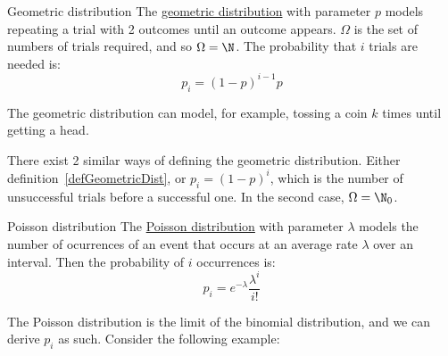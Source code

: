 \documentclass[../Main.tex]{subfiles}
\begin{document}
\begin{definition}{Geometric distribution}
    The \underline{geometric distribution} with parameter $p$ models repeating a trial with 2 outcomes until an outcome appears. $\Omega$ is the set of numbers of trials required, and so $\Omega = \N$. The probability that $i$ trials are needed is:
    \begin{equation*}
        p_i = (1-p)^{i-1}p
    \end{equation*}
    \label{defGeometricDist}
\end{definition}
The geometric distribution can model, for example, tossing a coin $k$ times until getting a head.
\begin{warning}
    There exist 2 similar ways of defining the geometric distribution. Either definition~\ref{defGeometricDist}, or $p_i = (1-p)^i$, which is the number of unsuccessful trials before a successful one. In the second case, $\Omega = \N_0$.
\end{warning}
\begin{definition}{Poisson distribution}
    The \underline{Poisson distribution} with parameter $\lambda$ models the number of ocurrences of an event that occurs at an average rate $\lambda$ over an interval. Then the probability of $i$ occurrences is:
    \begin{equation*}
        p_i = e^{-\lambda}\frac{\lambda^i}{i!}
    \end{equation*}
\end{definition}
The Poisson distribution is the limit of the binomial distribution, and we can derive $p_i$ as such. Consider the following example:
\end{document}
